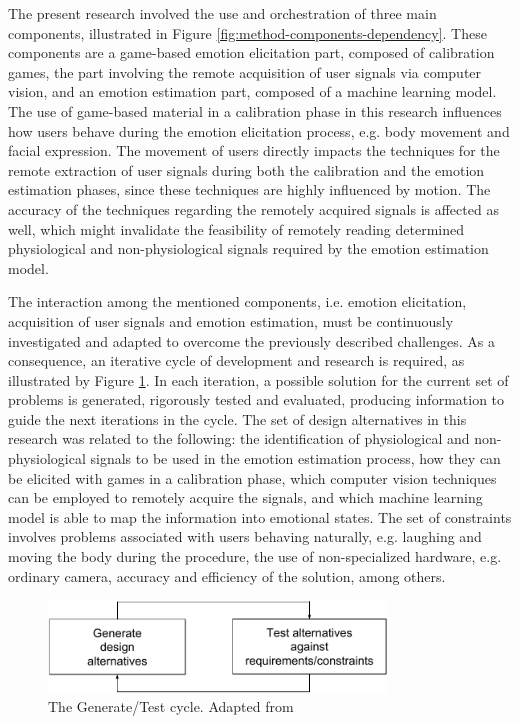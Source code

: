 The present research involved the use and orchestration of three main components, illustrated in Figure \ref{fig:method-components-dependency}. These components are a game-based emotion elicitation part, composed of calibration games, the part involving the remote acquisition of user signals via computer vision, and an emotion estimation part, composed of a machine learning model. The use of game-based material in a calibration phase in this research influences how users behave during the emotion elicitation process, e.g. body movement and facial expression. The movement of users directly impacts the techniques for the remote extraction of user signals during both the calibration and the emotion estimation phases, since these techniques are highly influenced by motion. The accuracy of the techniques regarding the remotely acquired signals is affected as well, which might invalidate the feasibility of remotely reading determined physiological and non-physiological signals required by the emotion estimation model.

The interaction among the mentioned components, i.e. emotion elicitation, acquisition of user signals and emotion estimation, must be continuously investigated and adapted to overcome the previously described challenges. As a consequence, an iterative cycle of development and research is required, as illustrated by Figure \ref{fig:hevner-generate-test}. In each iteration, a possible solution for the current set of problems is generated, rigorously tested and evaluated, producing information to guide the next iterations in the cycle. The set of design alternatives in this research was related to the following: the identification of physiological and non-physiological signals to be used in the emotion estimation process, how they can be elicited with games in a calibration phase, which computer vision techniques can be employed to remotely acquire the signals, and which machine learning model is able to map the information into emotional states. The set of constraints involves problems associated with users behaving naturally, e.g. laughing and moving the body during the procedure, the use of non-specialized hardware, e.g. ordinary camera, accuracy and efficiency of the solution, among others.

\begin{figure}[h]
    \centering
    \includegraphics[width=0.8\textwidth]{Content/figures/hevner-generate-test}
    \caption{The Generate/Test cycle. Adapted from \textcite{hevner2004design}}
    \label{fig:hevner-generate-test}
\end{figure}

